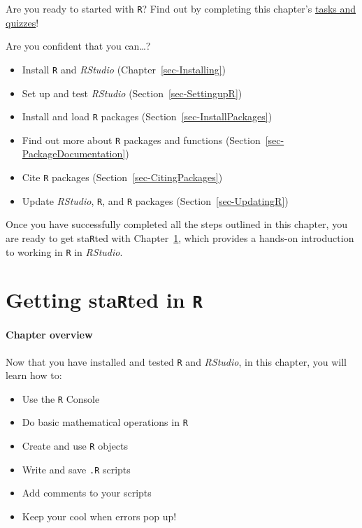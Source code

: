 \documentclass[
  letterpaper,
  DIV=11,
  numbers=noendperiod]{scrreprt}
\providecommand{\tightlist}{%
  \setlength{\itemsep}{0pt}\setlength{\parskip}{0pt}}
\begin{document}
Are you ready to started with \texttt{R}? Find out by completing this
chapter's
\href{https://elenlefoll.github.io/RstatsTextbook/quizzes/4_quiz.html}{tasks
and quizzes}!

Are you confident that you can\ldots?

\begin{itemize}
\tightlist
\item[$\square$]
  Install \texttt{R} and \emph{RStudio} (Chapter~\ref{sec-Installing})
\item[$\square$]
  Set up and test \emph{RStudio} (Section~\ref{sec-SettingupR})
\item[$\square$]
  Install and load \texttt{R} packages
  (Section~\ref{sec-InstallPackages})
\item[$\square$]
  Find out more about \texttt{R} packages and functions
  (Section~\ref{sec-PackageDocumentation})
\item[$\square$]
  Cite \texttt{R} packages (Section~\ref{sec-CitingPackages})
\item[$\square$]
  Update \emph{RStudio}, \texttt{R}, and \texttt{R} packages
  (Section~\ref{sec-UpdatingR})
\end{itemize}

Once you have successfully completed all the steps outlined in this
chapter, you are ready to get sta\texttt{R}ted with
Chapter~\ref{sec-GettingStaRted}, which provides a hands-on introduction
to working in \texttt{R} in \emph{RStudio}.~


\chapter{\texorpdfstring{Getting sta\texttt{R}ted in
\texttt{R}}{Getting staRted in R}}\label{sec-GettingStaRted}

\subsubsection*{\texorpdfstring{\textbf{Chapter
overview}}{Chapter overview}}\label{chapter-overview-4}

Now that you have installed and tested \texttt{R} and \emph{RStudio}, in
this chapter, you will learn how to:

\begin{itemize}
\tightlist
\item
  Use the \texttt{R} Console
\item
  Do basic mathematical operations in \texttt{R}
\item
  Create and use \texttt{R} objects
\item
  Write and save \texttt{.R} scripts
\item
  Add comments to your scripts
\item
  Keep your cool when errors pop up!
\end{itemize}
\end{document}

